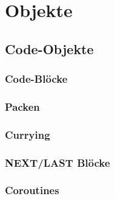 \section{Objekte}



\subsection{Code-Objekte}
\begin{frame}
	\frametitle{Code-Blöcke}
	
\end{frame}
\begin{frame}
	\frametitle{Packen}
	
\end{frame}
\begin{frame}
	\frametitle{Currying}
	
\end{frame}
\begin{frame}
	\frametitle{NEXT/LAST Blöcke}
	
\end{frame}


\begin{frame}
	\frametitle{Coroutines}
	
\end{frame}


